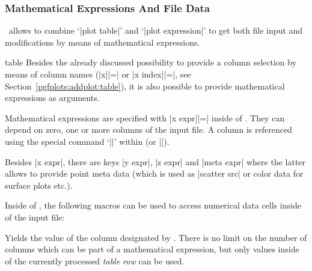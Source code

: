 {\subsubsection{Mathematical Expressions And File Data}
\PGFPlots\ allows to combine `|plot table|' and `|plot expression|' to get both file input and modifications by means of mathematical expressions.

\begin{addplotoperation}[]{table}{}
\label{pgfplots:addplot:table:expr}
	Besides the already discussed possibility to provide a column selection by means of column names (|x||=| or |x index||=|, see Section~\ref{pgfplots:addplot:table}), it is also possible to provide mathematical expressions as arguments.

	Mathematical expressions are specified with |x expr||=| inside of . They can depend on zero, one or more columns of the input file. A column is referenced using the special command `|\thisrow|' within  (or |\thisrowno|).

\begin{codeexample}[vbox]

\end{codeexample}

	Besides |x expr|, there are keys |y expr|, |z expr| and |meta expr| where the latter allows to provide point meta data (which is used as |scatter src| or color data for surface plots etc.).

	Inside of , the following macros can be used to access numerical data cells inside of the input file:

	\begin{command}{\thisrow{}}
		Yields the value of the column designated by . There is no limit on the number of columns which can be part of a mathematical expression, but only values inside of the currently processed \emph{table row} can be used.
		

\end{command}
\end{addplotoperation}}
